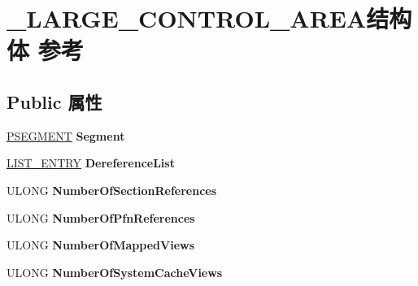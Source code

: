 \hypertarget{struct___l_a_r_g_e___c_o_n_t_r_o_l___a_r_e_a}{}\section{\+\_\+\+L\+A\+R\+G\+E\+\_\+\+C\+O\+N\+T\+R\+O\+L\+\_\+\+A\+R\+E\+A结构体 参考}
\label{struct___l_a_r_g_e___c_o_n_t_r_o_l___a_r_e_a}
\subsection*{Public 属性}
\begin{DoxyCompactItemize}
\item 
\mbox{\label{struct___l_a_r_g_e___c_o_n_t_r_o_l___a_r_e_a_ae2466e568123f7c0b15781e164f6975b}} 
\hyperlink{struct___s_e_g_m_e_n_t}{P\+S\+E\+G\+M\+E\+NT} {\bfseries Segment}
\item 
\mbox{\label{struct___l_a_r_g_e___c_o_n_t_r_o_l___a_r_e_a_aa8ba9b19f4fd65588657ab4031558fc9}} 
\hyperlink{struct___l_i_s_t___e_n_t_r_y}{L\+I\+S\+T\+\_\+\+E\+N\+T\+RY} {\bfseries Dereference\+List}
\item 
\mbox{\label{struct___l_a_r_g_e___c_o_n_t_r_o_l___a_r_e_a_abc5bb7810a4829bf61248e5672fda620}} 
U\+L\+O\+NG {\bfseries Number\+Of\+Section\+References}
\item 
\mbox{\label{struct___l_a_r_g_e___c_o_n_t_r_o_l___a_r_e_a_af3f9a317bcac4fd204316f4558a48f28}} 
U\+L\+O\+NG {\bfseries Number\+Of\+Pfn\+References}
\item 
\mbox{\label{struct___l_a_r_g_e___c_o_n_t_r_o_l___a_r_e_a_aeef41af0075e682535254f9918b3a28a}} 
U\+L\+O\+NG {\bfseries Number\+Of\+Mapped\+Views}
\item 
\mbox{\label{struct___l_a_r_g_e___c_o_n_t_r_o_l___a_r_e_a_a1eea098e63fbf538b5a4abe0a58fd337}} 
U\+L\+O\+NG {\bfseries Number\+Of\+System\+Cache\+Views}
\item 
\mbox{\label{struct___l_a_r_g_e___c_o_n_t_r_o_l___a_r_e_a_a8a598e5b99515f392774dcb4c30f516b}} 

\end{DoxyCompactItemize}
